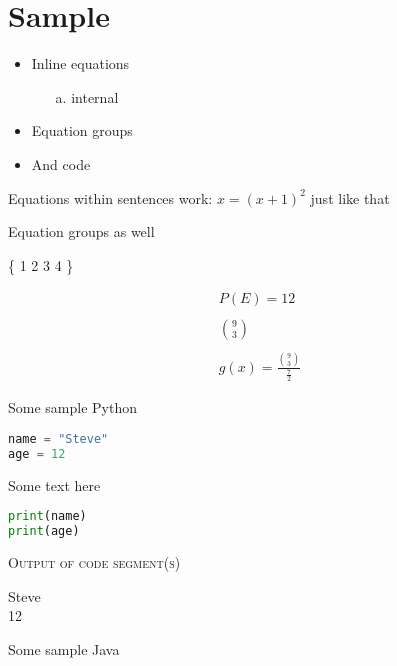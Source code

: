 \documentclass[letterpaper,12pt]{article}
\begin{document}
\section{Sample}

\begin{itemize}
	\item{Inline equations}
	\begin{itemize}
		\item[a.]{internal}
	\end{itemize}
	\item{Equation groups}
	\item{And code}
\end{itemize}

Equations within sentences work: \( x = (x + 1)^2 \) just like that

Equation groups as well

\{ 1 2 3 4 \}

\begin{minimal}
\begin{align}
P(E) = 12 \nonumber \\
\nonumber \\
{9 \choose 3} \nonumber \\
\nonumber \\
g(x) = \frac{{9 \choose 3}}{\frac{7}{2}} \nonumber
\end{align}
\end{minimal}


Some sample Python

\begin{minimal}
\begin{lstlisting}[language=python]
name = "Steve"
age = 12

\end{lstlisting}
\end{minimal}

Some text here

\begin{minimal}
\begin{lstlisting}[language=python]
print(name)
print(age)
\end{lstlisting}
\end{minimal}
\pagebreak
\begin{center}
\textsc{\large Output of code segment(s)}\\
\end{center}
\begin{minimal}
Steve\\
12
\end{minimal}
Some sample Java
\end{document}
